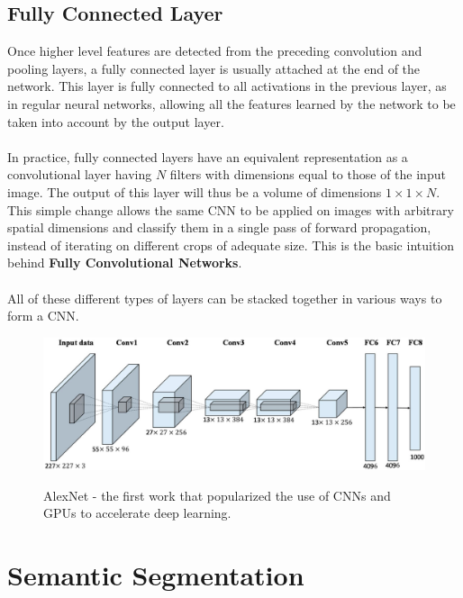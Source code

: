 \documentclass[12pt, a4paper]{report}
\begin{document}
\subsection{Fully Connected Layer}
Once higher level features are detected from the preceding convolution and pooling layers, a fully connected layer is usually attached at the end of the network. This layer is fully connected to all activations in the previous layer, as in regular neural networks, allowing all the features learned by the network to be taken into account by the output layer. \paragraph{}
In practice, fully connected layers have an equivalent representation as a convolutional layer having $N$ filters with dimensions equal to those of the input image. The output of this layer will thus be a volume of dimensions $1 \times 1 \times N$. This simple change allows the same CNN to be applied on images with arbitrary spatial dimensions and classify them in a single pass of forward propagation, instead of iterating on different crops of adequate size. This is the basic intuition behind \textbf{Fully Convolutional Networks}.\cite{long2015fully}
\paragraph{}
All of these different types of layers can be stacked together in various ways to form a CNN.
\begin{figure}[h]
\centering
\includegraphics[width=\textwidth]{cnn3.jpg}
\caption{AlexNet - the first work that popularized the use of CNNs and GPUs to accelerate deep learning.}\cite{alexnet, alexnetimg}
\end{figure}
\section{Semantic Segmentation}
\printbibliography[title={References}]
\end{document}
